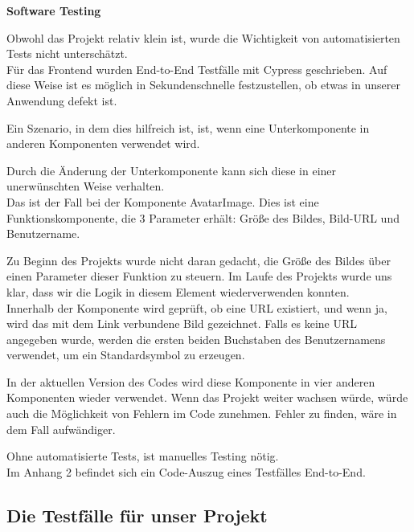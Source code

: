 \textbf{Software Testing }
\begin{flushleft}
Obwohl das Projekt relativ klein ist, wurde die Wichtigkeit von automatisierten Tests nicht unterschätzt.
\\
Für das Frontend wurden End-to-End Testfälle mit Cypress geschrieben.
Auf diese Weise ist es möglich in Sekundenschnelle festzustellen, ob etwas in unserer Anwendung defekt ist.

Ein Szenario, in dem dies hilfreich ist, ist, wenn eine Unterkomponente in anderen Komponenten verwendet wird.

Durch die Änderung der Unterkomponente kann sich diese in einer unerwünschten Weise verhalten.
\\
Das ist der Fall bei der Komponente AvatarImage.
Dies ist eine Funktionskomponente, die 3 Parameter erhält: Größe des Bildes, Bild-URL und Benutzername.

Zu Beginn des Projekts wurde nicht daran gedacht, die Größe des Bildes über einen Parameter dieser Funktion zu steuern. Im Laufe des Projekts wurde uns klar, dass wir die Logik in diesem Element wiederverwenden konnten.
\\
Innerhalb der Komponente wird geprüft, ob eine URL existiert, und wenn ja, wird das mit dem Link verbundene Bild gezeichnet. Falls es keine URL  angegeben wurde, werden die ersten beiden Buchstaben des Benutzernamens verwendet, um ein Standardsymbol zu erzeugen.

In der aktuellen Version des Codes wird diese Komponente in vier anderen Komponenten wieder verwendet.
Wenn das Projekt weiter wachsen würde, würde auch die Möglichkeit von Fehlern im Code zunehmen. Fehler zu finden, wäre in dem Fall aufwändiger.

Ohne automatisierte Tests, ist manuelles Testing nötig.
\\
Im Anhang 2 befindet sich ein Code-Auszug eines Testfälles End-to-End. 
\end{flushleft}



\subsection{Die Testfälle für unser Projekt}
